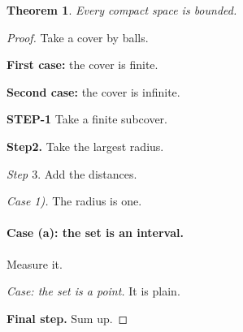 \documentclass{article}
\newtheorem{theorem}{Theorem}
\begin{document}
\begin{theorem}
Every compact space is bounded.
\end{theorem}
\begin{proof}
Take a cover by balls.

\textbf{First case:} the cover is finite.

\textbf{Second case:} the cover is infinite.

\noindent\textbf{STEP-1} Take a finite subcover.

\indent \textbf{Step2.} Take the largest radius.

{\em Step $3$}. Add the distances.

\emph{Case 1).} The radius is one.

\paragraph{Case (a): the set is an interval.} Measure it.

\textit{Case: the set is a point.} It is plain.

{\bf Final step.} Sum up.
\end{proof}
\end{document}
